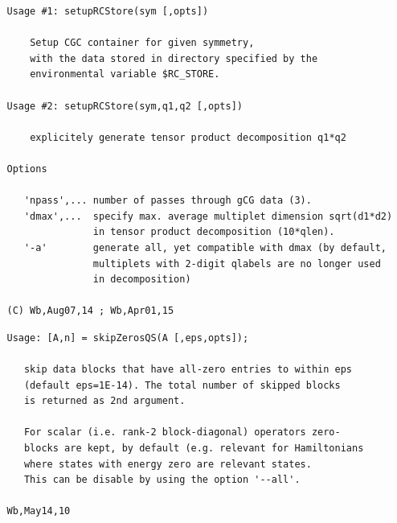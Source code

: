\documentclass[twoside,12pt]{article}
\begin{document}
\pagebreak[3]



\begin{verbatim}
   Usage #1: setupRCStore(sym [,opts])
 
       Setup CGC container for given symmetry,
       with the data stored in directory specified by the
       environmental variable $RC_STORE.
 
   Usage #2: setupRCStore(sym,q1,q2 [,opts])
 
       explicitely generate tensor product decomposition q1*q2
 
   Options
 
      'npass',... number of passes through gCG data (3).
      'dmax',...  specify max. average multiplet dimension sqrt(d1*d2)
                  in tensor product decomposition (10*qlen).
      '-a'        generate all, yet compatible with dmax (by default,
                  multiplets with 2-digit qlabels are no longer used
                  in decomposition)
 
   (C) Wb,Aug07,14 ; Wb,Apr01,15
\end{verbatim}

\pagebreak[3]



\begin{verbatim}
   Usage: [A,n] = skipZerosQS(A [,eps,opts]);
 
      skip data blocks that have all-zero entries to within eps
      (default eps=1E-14). The total number of skipped blocks
      is returned as 2nd argument.
 
      For scalar (i.e. rank-2 block-diagonal) operators zero-
      blocks are kept, by default (e.g. relevant for Hamiltonians
      where states with energy zero are relevant states.
      This can be disable by using the option '--all'.
 
   Wb,May14,10
\end{verbatim}

\pagebreak[3]


\end{document}
